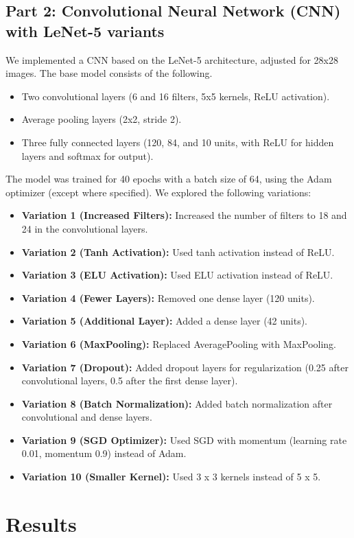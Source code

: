 \documentclass[a4paper,12pt]{article}
\begin{document}
\subsection{Part 2: Convolutional Neural Network (CNN) with LeNet-5 variants}
We implemented a CNN based on the LeNet-5 architecture, adjusted for 28x28 images. The base model consists of the following.
\begin{itemize}
    \item Two convolutional layers (6 and 16 filters, 5x5 kernels, ReLU activation).
    \item Average pooling layers (2x2, stride 2).
    \item Three fully connected layers (120, 84, and 10 units, with ReLU for hidden layers and softmax for output).
\end{itemize}
The model was trained for 40 epochs with a batch size of 64, using the Adam optimizer (except where specified). We explored the following variations:
\begin{itemize}
    \item \textbf{Variation 1 (Increased Filters):} Increased the number of filters to 18 and 24 in the convolutional layers.
    \item \textbf{Variation 2 (Tanh Activation):} Used tanh activation instead of ReLU.
    \item \textbf{Variation 3 (ELU Activation):} Used ELU activation instead of ReLU.
    \item \textbf{Variation 4 (Fewer Layers):} Removed one dense layer (120 units).
    \item \textbf{Variation 5 (Additional Layer):} Added a dense layer (42 units).
    \item \textbf{Variation 6 (MaxPooling):} Replaced AveragePooling with MaxPooling.
    \item \textbf{Variation 7 (Dropout):} Added dropout layers for regularization (0.25 after convolutional layers, 0.5 after the first dense layer).
    \item \textbf{Variation 8 (Batch Normalization):} Added batch normalization after convolutional and dense layers.
    \item \textbf{Variation 9 (SGD Optimizer):} Used SGD with momentum (learning rate 0.01, momentum 0.9) instead of Adam.
    \item \textbf{Variation 10 (Smaller Kernel):} Used 3 x 3 kernels instead of 5 x 5.
\end{itemize}

\section{Results}
\end{document}
